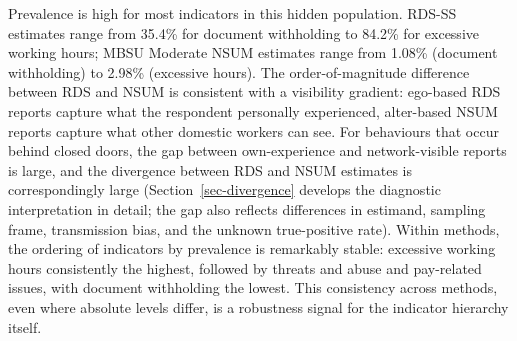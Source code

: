 \documentclass[
  12pt,
  letterpaper,
  DIV=11,
  numbers=noendperiod]{scrartcl}
\begin{document}
Prevalence is high for most indicators in this hidden population. RDS-SS
estimates range from 35.4\% for document withholding to 84.2\% for
excessive working hours; MBSU Moderate NSUM estimates range from 1.08\%
(document withholding) to 2.98\% (excessive hours). The
order-of-magnitude difference between RDS and NSUM is consistent with a
visibility gradient: ego-based RDS reports capture what the respondent
personally experienced, alter-based NSUM reports capture what other
domestic workers can see. For behaviours that occur behind closed doors,
the gap between own-experience and network-visible reports is large, and
the divergence between RDS and NSUM estimates is correspondingly large
(Section~\ref{sec-divergence} develops the diagnostic interpretation in
detail; the gap also reflects differences in estimand, sampling frame,
transmission bias, and the unknown true-positive rate). Within methods,
the ordering of indicators by prevalence is remarkably stable: excessive
working hours consistently the highest, followed by threats and abuse
and pay-related issues, with document withholding the lowest. This
consistency across methods, even where absolute levels differ, is a
robustness signal for the indicator hierarchy itself.
\end{document}
